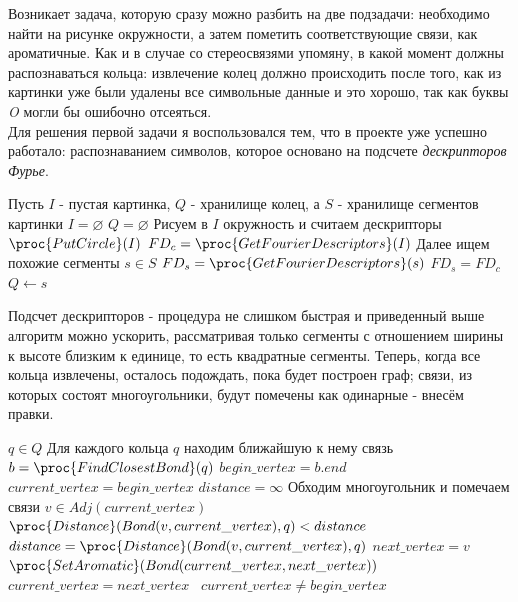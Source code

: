 \noindent
Возникает задача, которую сразу можно разбить на две подзадачи: необходимо найти на рисунке окружности, а затем пометить соответствующие связи, 
как ароматичные. Как и в случае со стереосвязями упомяну, в какой момент должны распознаваться кольца: извлечение колец должно происходить после того, 
как из картинки уже были удалены все символьные данные и это хорошо, так как буквы \emph{O} могли бы ошибочно отсеяться. \\

\noindent
Для решения первой задачи я воспользовался тем, что в проекте уже успешно работало: распознаванием символов, которое основано на подсчете 
\emph{дескрипторов Фурье}.

\begin{codebox}
  \li \Comment Пусть $I$ - пустая картинка, $Q$ - хранилище колец, а $S$ - хранилище сегментов картинки
  \li $I = \varnothing$
  \li $Q = \varnothing$
  \li \Comment Рисуем в $I$ окружность и считаем дескрипторы
  \li $\proc{PutCircle}(I)$
  \li $ FD_{c} = \proc{GetFourierDescriptors}(I)$
  \li \Comment Далее ищем похожие сегменты
  \li \For $s \in S$
  \li \Do $FD_{s} = \proc{GetFourierDescriptors}(s)$
  \li \If $FD_{s} = FD_{c}$
  \li \Then $Q \gets s$  
\end{codebox}

\noindent
Подсчет дескрипторов - процедура не слишком быстрая и приведенный выше алгоритм можно ускорить, рассматривая только сегменты
с отношением ширины к высоте близким к единице, то есть квадратные сегменты. Теперь, когда все кольца извлечены, осталось подождать, пока
будет построен граф; связи, из которых состоят многоугольники, будут помечены как одинарные - внесём правки.

\begin{codebox}
  \li \For $q \in Q$
  \li \Comment Для каждого кольца $q$ находим ближайшую к нему связь
  \li \Do $b = \proc{FindClosestBond}(q)$
  \li $begin\_vertex = b.end$
  \li $current\_vertex = begin\_vertex$
  \li $distance = \infty$
  \li \Comment Обходим многоугольник и помечаем связи 
  \li \Repeat 
  \li \For $v \in Adj(current\_vertex)$
  \li \Do \If $\proc{Distance}(Bond(v,current\_vertex), q) < distance $
  \li \Then $distance = \proc{Distance}(Bond(v,current\_vertex), q)$ 
  \li $next\_vertex = v $ \End \End
  \li $\proc{SetAromatic}(Bond(current\_vertex, next\_vertex))$
  \li $current\_vertex = next\_vertex$ \
  \li \Until $current\_vertex \ne begin\_vertex$
\end{codebox}

